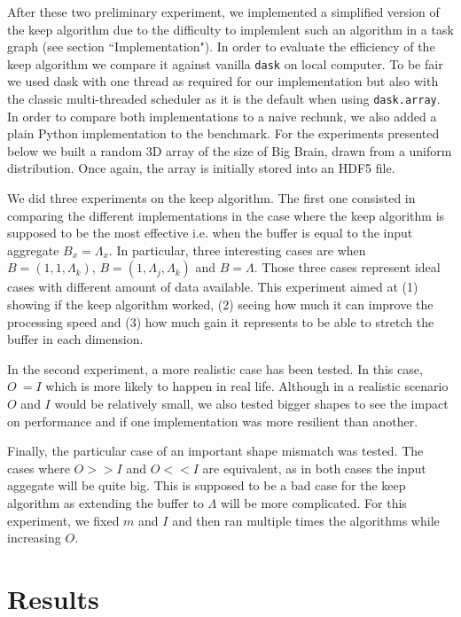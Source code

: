\documentclass[conference]{IEEEtran}
\begin{document}
After these two preliminary experiment, we implemented a simplified version of
the keep algorithm due to the difficulty to implemlent such an algorithm in a
task graph (see section ``Implementation"). In order to evaluate the
efficiency of the keep algorithm we compare it against vanilla \texttt{dask} on local
computer. To be fair we used dask with one thread as required for our
implementation but also with the classic multi-threaded  scheduler as it is the
default when using \texttt{dask.array}. In order to compare both implementations to a
naive rechunk, we also added a plain Python implementation to the benchmark. For
the experiments presented below we built a random 3D array of the size of Big
Brain, drawn from a uniform distribution. Once again, the array is initially
stored into an HDF5 file.

We did three experiments on the keep algorithm. The first one consisted in
comparing the different implementations in the case where the keep algorithm is
supposed to be the most effective i.e. when the buffer is equal to the input
aggregate $B_x=\Lambda_x$. In particular, three interesting cases are when
$B=(1,1,\Lambda_k)$, $B=(1,\Lambda_j, \Lambda_k)$ and $B=\Lambda$. Those three
cases represent ideal cases with different amount of data available. This
experiment aimed at (1) showing if the keep algorithm worked, (2) seeing how much it
can improve the processing speed and (3) how much gain it represents to be able to
stretch the buffer in each dimension.

In the second experiment, a more realistic case has been tested. In this case,
$O~=I$ which is more likely to happen in real life. Although in a realistic
scenario $O$ and $I$ would be relatively small, we also tested bigger shapes to
see the impact on performance and if one implementation was more resilient than
another.

Finally, the particular case of an important shape mismatch was tested. The cases
where $O>>I$ and $O<<I$ are equivalent, as in both cases the input aggegate
will be quite big. This is supposed to be a bad case for the keep algorithm
as extending the buffer to $\Lambda$ will be more complicated. For this
experiment, we fixed $m$ and $I$ and then ran multiple times the algorithms
while increasing $O$.

\section{Results}
\end{document}

